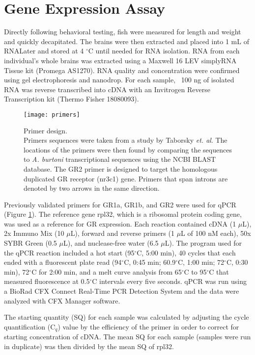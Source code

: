 \documentclass[12pt,twoside]{reedthesis}
\begin{document}
\section{Gene Expression Assay}
Directly following behavioral testing, fish were measured for length and weight
and quickly decapitated. The brains were then extracted and placed into 1 mL of
RNALater and
stored at 4 $^\circ$C until needed for RNA isolation. RNA from each individual's
whole brains was extracted
using a Maxwell 16 LEV simplyRNA Tissue kit (Promega AS1270). RNA quality and concentration were confirmed using gel
electrophoresis and nanodrop. For each sample, ~100 ng of isolated RNA was
reverse transcribed into cDNA with an Invitrogen Reverse Transcription kit
(Thermo Fisher 18080093).

\begin{figure}[htbp] 
\begin{centering} 
\texttt{[image: primers]}
\caption[Primer design]{\footnotesize{Primer design. \\ Primers sequences were taken
  from a study by Taborsky \textit{et. al}. The locations of the primers were then found by
  comparing the sequences to \textit{A. burtoni} transcriptional sequences using
the NCBI BLAST database. The GR2 primer is designed to target the homologous
duplicated GR receptor (nr3c1) gene. Primers that span introns are denoted by two arrows in
the same direction.}} 
\label{primers}
\end{centering} 
\end{figure}

Previously validated primers for GR1a, GR1b, and GR2 were used for qPCR
\citep{solomon-lane_early-life_2018} (Figure \ref{primers}). The
reference gene rpl32, which is a ribosomal protein coding gene, was used as a
reference for GR expression. Each reaction contained cDNA (1 $\mu$L), 2x Immuno Mix (10 $\mu$L),
forward and reverse primers (1 $\mu$L of 100 nM each), 50x SYBR Green (0.5
$\mu$L), and nuclease-free water (6.5 $\mu$L). The program used for the qPCR
reaction included a hot start (95$^\circ$C, 5:00 min), 40 cycles that each
ended with a fluorescent plate read (94$^\circ$C, 0:45 min; 60.9$^\circ$C, 1:00
min; 72$^\circ$C, 0:30 min), 72$^\circ$C for 2:00 min, and a melt curve analysis from 65$^\circ$C to
95$^\circ$C that measured fluorescence at 0.5$^\circ$C intervals every five
seconds. qPCR was run using a BioRad CFX Connect Real-Time PCR Detection System
and the data were analyzed with CFX Manager software.

The starting quantity (SQ) for each sample was calculated by adjusting the cycle
quantification (C$_{q}$)
value by the efficiency of the primer in order to
correct for starting concentration of cDNA. The 
mean SQ for each sample (samples were run in duplicate) was then divided by the mean SQ
of rpl32.
\end{document}
